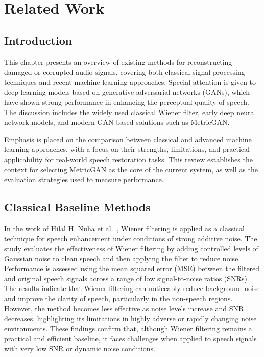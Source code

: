 \chapter{Related Work}


\section{Introduction}
This chapter presents an overview of existing methods for reconstructing damaged or corrupted audio signals, covering both classical signal processing techniques and recent machine learning approaches. Special attention is given to deep learning models based on generative adversarial networks (GANs), which have shown strong performance in enhancing the perceptual quality of speech. The discussion includes the widely used classical Wiener filter, early deep neural network models, and modern GAN-based solutions such as MetricGAN.

Emphasis is placed on the comparison between classical and advanced machine learning approaches, with a focus on their strengths, limitations, and practical applicability for real-world speech restoration tasks. This review establishes the context for selecting MetricGAN as the core of the current system, as well as the evaluation strategies used to measure performance.


\section{Classical Baseline Methods}

In the work of Hilal H. Nuha et al.~\cite{nuha-noise-reduction}, Wiener filtering is applied as a classical technique for speech enhancement under conditions of strong additive noise. The study evaluates the effectiveness of Wiener filtering by adding controlled levels of Gaussian noise to clean speech and then applying the filter to reduce noise. Performance is assessed using the mean squared error (MSE) between the filtered and original speech signals across a range of low signal-to-noise ratios (SNRs). The results indicate that Wiener filtering can noticeably reduce background noise and improve the clarity of speech, particularly in the non-speech regions. However, the method becomes less effective as noise levels increase and SNR decreases, highlighting its limitations in highly adverse or rapidly changing noise environments. These findings confirm that, although Wiener filtering remains a practical and efficient baseline, it faces challenges when applied to speech signals with very low SNR or dynamic noise conditions.

